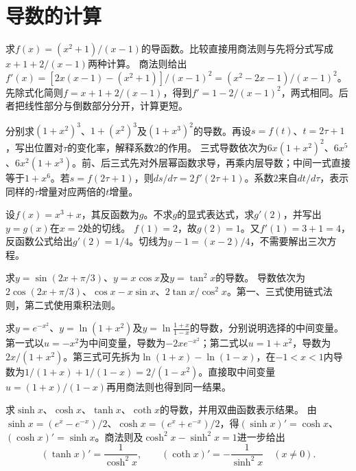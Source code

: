 \par\addvspace{12pt}

\section{导数的计算}

求\(f(x)=(x^2+1)/(x-1)\)的导函数。比较直接用商法则与先将分式写成\(x+1+2/(x-1)\)两种计算。
\solutionanswer
商法则给出\(f'(x)=[2x(x-1)-(x^2+1)]/(x-1)^2=(x^2-2x-1)/(x-1)^2\)。先除式化简则\(f=x+1+2/(x-1)\)，得到\(f'=1-2/(x-1)^2\)，两式相同。后者把线性部分与倒数部分分开，计算更短。


分别求\((1+x^2)^3\)、\(1+(x^2)^3\)及\((1+x^3)^2\)的导数。再设\(s=f(t)\)、\(t=2\tau+1\)，写出位置对\(\tau\)的变化率，解释系数\(2\)的作用。
\solutionanswer
三式导数依次为\(6x(1+x^2)^2\)、\(6x^5\)、\(6x^2(1+x^3)\)。前、后三式先对外层幂函数求导，再乘内层导数；中间一式直接等于\(1+x^6\)。若\(s=f(2\tau+1)\)，则\(ds/d\tau=2f'(2\tau+1)\)。系数\(2\)来自\(dt/d\tau\)，表示同样的\(\tau\)增量对应两倍的\(t\)增量。


设\(f(x)=x^3+x\)，其反函数为\(g\)。不求\(g\)的显式表达式，求\(g'(2)\)，并写出\(y=g(x)\)在\(x=2\)处的切线。
\solutionanswer
\(f(1)=2\)，故\(g(2)=1\)。又\(f'(1)=3+1=4\)，反函数公式给出\(g'(2)=1/4\)。切线为\(y-1=(x-2)/4\)，不需要解出三次方程。


求\(y=\sin(2x+\pi/3)\)、\(y=x\cos x\)及\(y=\tan^2x\)的导数。
\solutionanswer
导数依次为\(2\cos(2x+\pi/3)\)、\(\cos x-x\sin x\)、\(2\tan x/\cos^2x\)。第一、三式使用链式法则，第二式使用乘积法则。


求\(y=e^{-x^2}\)、\(y=\ln(1+x^2)\)及\(y=\ln\frac{1+x}{1-x}\)的导数，分别说明选择的中间变量。
\solutionanswer
第一式以\(u=-x^2\)为中间变量，导数为\(-2xe^{-x^2}\)；第二式以\(u=1+x^2\)，导数为\(2x/(1+x^2)\)。第三式可先拆为\(\ln(1+x)-\ln(1-x)\)，在\(-1<x<1\)内导数为\(1/(1+x)+1/(1-x)=2/(1-x^2)\)。直接取中间变量\(u=(1+x)/(1-x)\)再用商法则也得到同一结果。


求\(\sinh x\)、\(\cosh x\)、\(\tanh x\)、\(\coth x\)的导数，并用双曲函数表示结果。
\solutionanswer
由\(\sinh x=(e^x-e^{-x})/2\)、\(\cosh x=(e^x+e^{-x})/2\)，得\((\sinh x)'=\cosh x\)、\((\cosh x)'=\sinh x\)。商法则及\(\cosh^2x-\sinh^2x=1\)进一步给出
\[
 (\tanh x)'=\frac1{\cosh^2x},\qquad
 (\coth x)'=-\frac1{\sinh^2x}\quad(x\ne0).
\]



